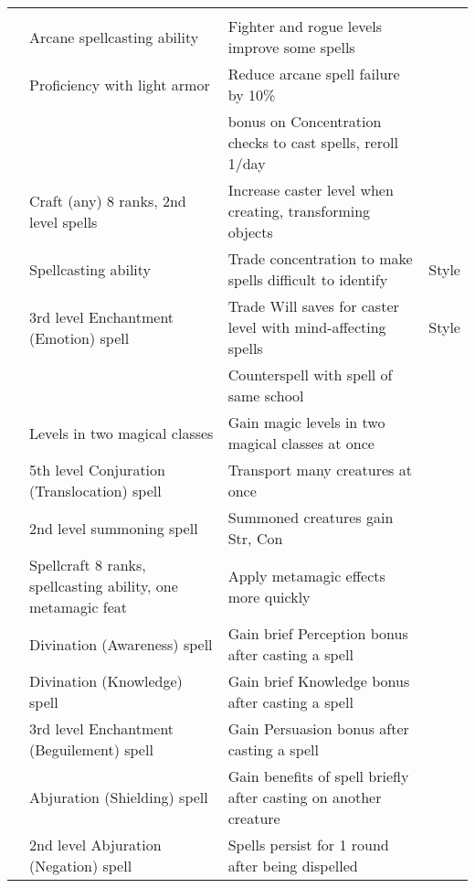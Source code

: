 {\begin{longtabu}{>{\lcol}p{15em} >{\lcol}p{15em} >{\lcol}X >{\lcol}p{10em}}
\midrule
{} &  &  &  \\
 & Arcane spellcasting ability & Fighter and rogue levels improve some spells & \x \\ 
 & Proficiency with light armor & Reduce arcane spell failure by 10\% & \x \\
 & \x &   bonus on Concentration checks to cast spells, reroll 1/day & \x \\
 & Craft (any) 8 ranks, 2nd level spells & Increase caster level when creating, transforming objects & \x \\
 & Spellcasting ability & Trade concentration to make spells difficult to identify & Style \\
 & 3rd level Enchantment (Emotion) spell & Trade Will saves for caster level with mind-affecting spells & Style \\
 & \x &  Counterspell with spell of same school & \x \\
 & Levels in two magical classes & Gain magic levels in two magical classes at once & \x \\
 & 5th level Conjuration (Translocation) spell & Transport many creatures at once & \x \\ 
 & 2nd level summoning spell & Summoned creatures gain  Str,  Con & \x \\
 & Spellcraft 8 ranks, spellcasting ability, one metamagic feat & Apply metamagic effects more quickly & \x \\
 & Divination (Awareness) spell & Gain brief Perception bonus after casting a spell & \x \\
 & Divination (Knowledge) spell & Gain brief Knowledge bonus after casting a spell & \x \\
 & 3rd level Enchantment (Beguilement) spell & Gain Persuasion bonus after casting a spell & \x \\
 & Abjuration (Shielding) spell & Gain benefits of spell briefly after casting on another creature & \x \\
 & 2nd level Abjuration (Negation) spell & Spells persist for 1 round after being dispelled & \x \\

\end{longtabu}}
